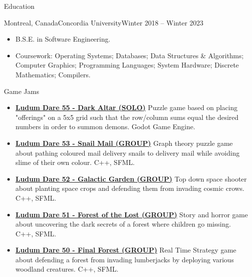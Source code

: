 \documentclass[]{mcdowellcv}
\begin{document}
	\begin{cvsection}{Education}
		\begin{cvsubsection}{Montreal, Canada}{Concordia University}{Winter 2018 -- Winter 2023}
			\begin{itemize}
				\item B.S.E. in Software Engineering.
                \item Coursework: Operating Systems; Databases; Data Structures \& Algorithms; Computer Graphics; Programming Languages; System Hardware; Discrete Mathematics; Compilers.
			\end{itemize}
		\end{cvsubsection}
	\end{cvsection}
	
	\begin{cvsection}{Game Jams}
		\begin{cvsubsection}{}{}{}	
			\begin{itemize}
                \item \textbf{\href{https://ldjam.com/events/ludum-dare/55/dark-altar}{Ludum Dare 55 - Dark Altar (SOLO)}} Puzzle game based on placing "offerings" on a 5x5 grid such that the row/column sums equal the desired numbers in order to summon demons. Godot Game Engine.
                \item \textbf{\href{https://ldjam.com/events/ludum-dare/53/snail-mail-2}{Ludum Dare 53 - Snail Mail (GROUP)}} Graph theory puzzle game about pathing coloured mail delivery snails to delivery mail while avoiding slime of their own colour. C++, SFML.
				\item \textbf{\href{https://ldjam.com/events/ludum-dare/52/galactic-garden}{Ludum Dare 52 - Galactic Garden (GROUP)}} Top down space shooter about planting space crops and defending them from invading cosmic crows. C++, SFML.
				\item \textbf{\href{https://ldjam.com/events/ludum-dare/51/forest-of-the-lost}{Ludum Dare 51 - Forest of the Lost (GROUP)}} Story and horror game about uncovering the dark secrets of a forest where children go missing. C++, SFML.
				\item \textbf{\href{https://ldjam.com/events/ludum-dare/50/final-forest}{Ludum Dare 50 - Final Forest (GROUP)}} Real Time Strategy game about defending a forest from invading lumberjacks by deploying various woodland creatures. C++, SFML.
			\end{itemize}
		\end{cvsubsection}
	\end{cvsection}
\end{document}
